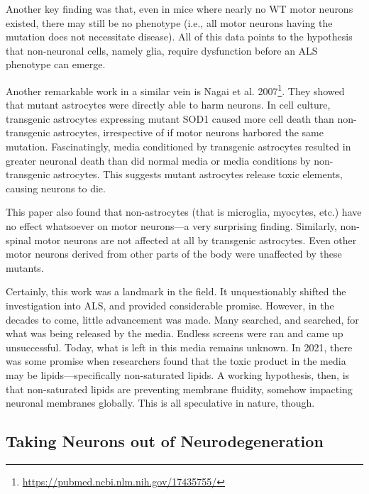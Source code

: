 Another key finding was that, even in mice where nearly no WT motor neurons existed, there may still be no phenotype (i.e., all motor neurons having the mutation does not necessitate disease). All of this data points to the hypothesis that non-neuronal cells, namely glia, require dysfunction before an ALS phenotype can emerge.\newline


Another remarkable work in a similar vein is Nagai et al. 2007\footnote{\url{https://pubmed.ncbi.nlm.nih.gov/17435755/}}. They showed that mutant astrocytes were directly able to harm neurons. In cell culture, transgenic astrocytes expressing mutant SOD1 caused more cell death than non-transgenic astrocytes, irrespective of if motor neurons harbored the same mutation. Fascinatingly, media conditioned by transgenic astrocytes resulted in greater neuronal death  than did normal media or media conditions by non-transgenic astrocytes. This suggests mutant astrocytes release toxic elements, causing neurons to die.\newline

This paper also found that non-astrocytes (that is microglia, myocytes, etc.) have no effect whatsoever on motor neurons---a very surprising finding. Similarly, non-spinal motor neurons are not affected at all by transgenic astrocytes. Even other motor neurons derived from other parts of the body were unaffected by these mutants.\newline

Certainly, this work was a landmark in the field. It unquestionably shifted the investigation into ALS, and provided considerable promise. However, in the decades to come, little advancement was made. Many searched, and searched, for what was being released by the media. Endless screens were ran and came up unsuccessful. Today, what is left in this media remains unknown. In 2021, there was some promise when researchers found that the toxic product in the media may be lipids---specifically non-saturated lipids. A working hypothesis, then, is that non-saturated lipids are preventing membrane fluidity, somehow impacting neuronal membranes globally. This is all speculative in nature, though.  

\subsection*{Taking Neurons out of Neurodegeneration}


